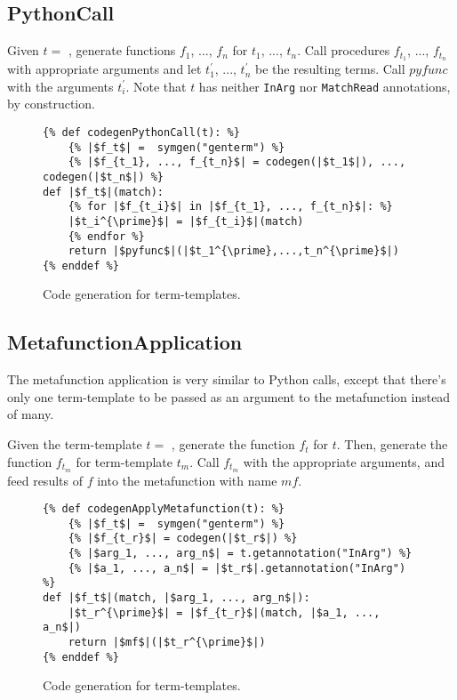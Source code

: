 \subsection{PythonCall}
Given $t=$ \space \PythonCall \space, generate functions $f_1$, ..., $f_n$ for $t_1$, ..., $t_n$. Call procedures $f_{t_1}$, ..., $f_{t_n}$ with appropriate arguments and let $t_1^{\prime}$, ..., $t_n^{\prime}$ be the resulting terms. Call $pyfunc$ with the arguments $t_i^{\prime}$. Note that $t$ has neither \texttt{InArg} nor \texttt{MatchRead} annotations, by construction.

\begin{figure}[htb]
\begin{verbatim}
{% def codegenPythonCall(t): %}
	{% |$f_t$| =  symgen("genterm") %}
	{% |$f_{t_1}, ..., f_{t_n}$| = codegen(|$t_1$|), ..., codegen(|$t_n$|) %}
def |$f_t$|(match):
	{% for |$f_{t_i}$| in |$f_{t_1}, ..., f_{t_n}$|: %}
	|$t_i^{\prime}$| = |$f_{t_i}$|(match)
	{% endfor %}
	return |$pyfunc$|(|$t_1^{\prime},...,t_n^{\prime}$|)
{% enddef %}
\end{verbatim}
\caption{Code generation for \PythonCallNoArg \space term-templates.}
\label{codegen-term-pycall}
\end{figure}


\subsection{MetafunctionApplication}
The metafunction application is very similar to Python calls, except that there's only one term-template to be passed as an argument to the metafunction instead of many.

Given the term-template $t=$ \ApplyMetafunction, generate the function $f_t$ for $t$. Then, generate the function $f_{t_m}$ for term-template $t_m$. Call $f_{t_m}$ with the appropriate arguments, and feed results of $f$ into the metafunction with name $mf$.

\begin{figure}[htb]
\begin{verbatim}
{% def codegenApplyMetafunction(t): %}
	{% |$f_t$| =  symgen("genterm") %}
	{% |$f_{t_r}$| = codegen(|$t_r$|) %}
	{% |$arg_1, ..., arg_n$| = t.getannotation("InArg") %}
	{% |$a_1, ..., a_n$| = |$t_r$|.getannotation("InArg") %}
def |$f_t$|(match, |$arg_1, ..., arg_n$|):
	|$t_r^{\prime}$| = |$f_{t_r}$|(match, |$a_1, ..., a_n$|)
	return |$mf$|(|$t_r^{\prime}$|)
{% enddef %}
\end{verbatim}
\caption{Code generation for \MetafunctionApplicationNoArgs \space term-templates.}
\label{codegen-term-mfapply}
\end{figure}
